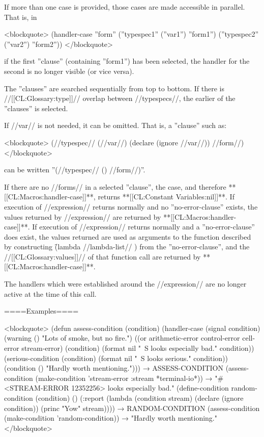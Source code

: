 If more than one case is provided, those cases are made accessible in parallel. That is, in

<blockquote> (handler-case ''form'' (''typespec1'' (''var1'') ''form1'') (''typespec2'' (''var2'') ''form2'')) </blockquote>

if the first ''clause'' (containing ''form1'') has been selected, the handler for the second is no longer visible (or vice versa).

The ''clauses'' are searched sequentially from top to bottom. If there is //[[CL:Glossary:type]]// overlap between //typespecs//, the earlier of the ''clauses'' is selected.

If //var// is not needed, it can be omitted. That is, a ''clause'' such as:

<blockquote> (//typespec// (//var//) (declare (ignore //var//)) //form//) </blockquote>

can be written ''(//typespec// () //form//)''.


If there are no //forms// in a selected ''clause'', the case, and therefore **[[CL:Macros:handler-case]]**, returns **[[CL:Constant Variables:nil]]**. If execution of //expression// returns normally and no ''no-error-clause'' exists, the values returned by //expression// are returned by **[[CL:Macros:handler-case]]**. If execution of //expression// returns normally and a ''no-error-clause'' does exist, the values returned are used as arguments to the function described by constructing \f{(lambda //lambda-list// )} from the ''no-error-clause'', and the //[[CL:Glossary:values]]// of that function call are returned by **[[CL:Macros:handler-case]]**.

The handlers which were established around the //expression// are no longer active at the time of this call.

====Examples====

<blockquote> (defun assess-condition (condition) (handler-case (signal condition) (warning () "Lots of smoke, but no fire.") ((or arithmetic-error control-error cell-error stream-error) (condition) (format nil "~S looks especially bad." condition)) (serious-condition (condition) (format nil "~S looks serious." condition)) (condition () "Hardly worth mentioning."))) → ASSESS-CONDITION (assess-condition (make-condition 'stream-error :stream *terminal-io*)) → "#<STREAM-ERROR 12352256> looks especially bad." (define-condition random-condition (condition) () (:report (lambda (condition stream) (declare (ignore condition)) (princ "Yow" stream)))) → RANDOM-CONDITION (assess-condition (make-condition 'random-condition)) → "Hardly worth mentioning." </blockquote>

